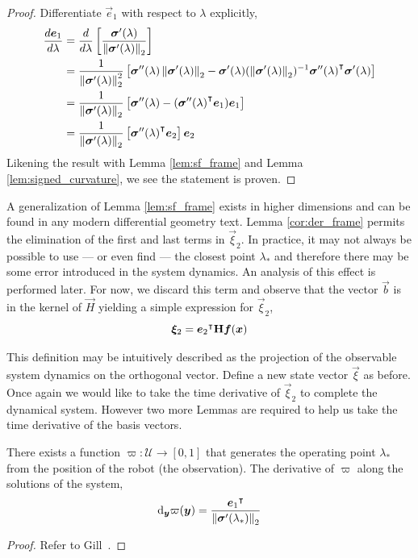 \documentclass[oneside, 11pt]{book}
\begin{document}
\begin{proof}
    Differentiate $\vec{e}_1$ with respect to $\lambda$ explicitly,
    \begin{align*}
        \frac{d\bm{e}_1}{d\lambda} &=  \frac{d}{d\lambda}\left[ \frac{\bm{\sigma}'(\lambda)}{\mathop{}\!\left\|\bm{\sigma}'(\lambda)\right\|_2}\right]\\
                                    &=  \frac{1}{\mathop{}\!\left\|\bm{\sigma}'(\lambda)\right\|_2^2}\left[\bm{\sigma}''(\lambda)\mathop{}\!\left\|\bm{\sigma}'(\lambda)\right\|_2-\bm{\sigma}'(\lambda)(\mathop{}\!\left\|\bm{\sigma}'(\lambda)\right\|_2)^{-1}{\bm{\sigma}''(\lambda)}^{\intercal}\bm{\sigma}'(\lambda)\right]\\
                                    &=  \frac{1}{\mathop{}\!\left\|\bm{\sigma}'(\lambda)\right\|_2}\left[\bm{\sigma}''(\lambda)-({\bm{\sigma}''(\lambda)}^{\intercal}\bm{e}_1)\bm{e}_1 \right]\\
                                    &=  \frac{1}{\mathop{}\!\left\|\bm{\sigma}'(\lambda)\right\|_2}\left[{\bm{\sigma}''(\lambda)}^{\intercal}\bm{e}_2\right]\bm{e}_2
    \end{align*}
    Likening the result with Lemma \ref{lem:sf_frame} and Lemma \ref{lem:signed_curvature}, we see the statement is proven.
\end{proof}
A generalization of Lemma \ref{lem:sf_frame} exists in higher dimensions and can be found in any modern differential geometry text\cite{Kuhnel06}. Lemma \ref{cor:der_frame} permits the elimination of the first and last terms in $\vec{\xi}_2$. In practice, it may not always be possible to use --- or even find --- the closest point $\lambda_*$ and therefore there may be some error introduced in the system dynamics. An analysis of this effect is performed later. For now, we discard this term and observe that the vector $\vec{b}$ is in the kernel of $\vec{H}$ yielding a simple expression for $\vec{\xi}_2$,
$$\bm{\xi}_2 = {\bm{e}_2}^{\intercal}\mathbf{H}\bm{f}(\bm{x})$$

This definition may be intuitively described as the projection of the observable system dynamics on the orthogonal vector. Define a new state vector $\vec{\xi}$ as before. Once again we would like to take the time derivative of $\vec{\xi}_2$ to complete the dynamical system. However two more Lemmas are required to help us take the time derivative of the basis vectors.
\begin{lemma}
    There exists a function $\varpi:\mathcal{U}\to[0,1]$ that generates the operating point $\lambda_*$ from the position of the robot (the observation). The derivative of $\varpi$ along the solutions of the system,
    $$\mathop{}\!\mathrm{d}_{\bm{y}}\varpi(\bm{y}) = \frac{{\bm{e}_1}^{\intercal}}{\mathop{}\!\left\|\bm{\sigma}'(\lambda_*)\right\|_2}$$
\end{lemma}
\begin{proof}
    Refer to Gill~\cite{Gill15}.
\end{proof}
\end{document}
